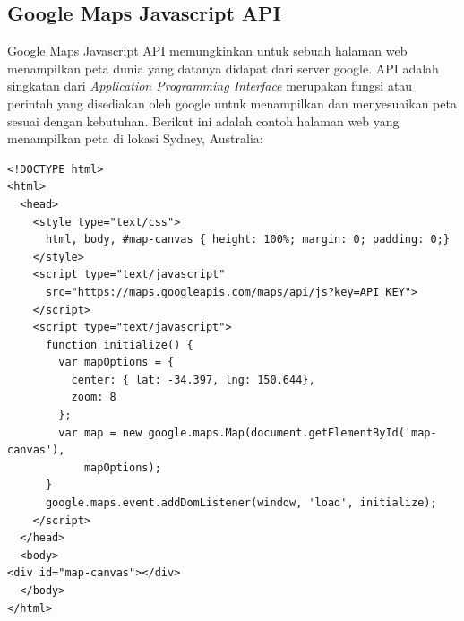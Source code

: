 \subsection{Google Maps Javascript API}
Google Maps Javascript API memungkinkan untuk sebuah halaman web menampilkan
peta dunia yang datanya didapat dari server google. API adalah singkatan dari
\textit{Application Programming Interface} merupakan fungsi atau perintah yang
disediakan oleh google untuk menampilkan dan menyesuaikan peta sesuai dengan
kebutuhan. Berikut ini adalah contoh halaman web yang menampilkan peta di lokasi
Sydney, Australia:
\lstset{
  language=HTML
}
\begin{lstlisting}
<!DOCTYPE html>
<html>
  <head>
    <style type="text/css">
      html, body, #map-canvas { height: 100%; margin: 0; padding: 0;}
    </style>
    <script type="text/javascript"
      src="https://maps.googleapis.com/maps/api/js?key=API_KEY">
    </script>
    <script type="text/javascript">
      function initialize() {
        var mapOptions = {
          center: { lat: -34.397, lng: 150.644},
          zoom: 8
        };
        var map = new google.maps.Map(document.getElementById('map-canvas'),
            mapOptions);
      }
      google.maps.event.addDomListener(window, 'load', initialize);
    </script>
  </head>
  <body>
<div id="map-canvas"></div>
  </body>
</html>
\end{lstlisting}
